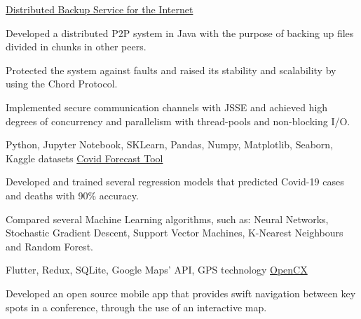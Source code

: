 
\begin{cventries}

  \cventry
  {} %
  {\href{https://github.com/MiguelDelPinto/distributed-backup-service/tree/master/proj2}{Distributed Backup Service for the Internet \faExternalLink}} %
  {} %
  {} %
  {
    \begin{cvitems} %
      \item {Developed a distributed P2P system in Java with the purpose of backing up files divided in chunks in other peers.}
      \item {Protected the system against faults and raised its stability and scalability by using the Chord Protocol.}
      \item {Implemented secure communication channels with JSSE and achieved high degrees of concurrency and parallelism with thread-pools and non-blocking I/O.}
    \end{cvitems}
  }

  \cventry
  {Python, Jupyter Notebook, SKLearn, Pandas, Numpy, Matplotlib, Seaborn, Kaggle datasets} %
  {\href{https://github.com/MiguelDelPinto/feup-iart/tree/master/proj2}{Covid Forecast Tool \faExternalLink}} %
  {} %
  {} %
  {
    \begin{cvitems} %
      \item {Developed and trained several regression models that predicted Covid-19 cases and deaths with 90\% accuracy.}
      \item {Compared several Machine Learning algorithms, such as: Neural Networks, Stochastic Gradient Descent, Support Vector Machines, K-Nearest Neighbours and Random Forest.}
    \end{cvitems}
  }

  \cventry
    {Flutter, Redux, SQLite, Google Maps' API, GPS technology} %
    {\href{https://github.com/softeng-feup/open-cx}{OpenCX \faExternalLink}} %
    {} %
    {} %
    {
      \begin{cvitems} %
      	\item {Developed an open source mobile app that provides swift navigation between key spots in a conference, through the use of an interactive map.}
      \end{cvitems}
    }

\end{cventries}
